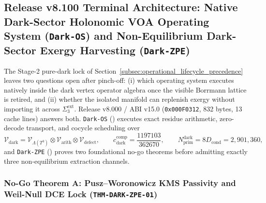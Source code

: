 \documentclass[11pt,onecolumn]{article}
\begin{document}
\FloatBarrier
\subsection{Release v8.100 Terminal Architecture: Native Dark-Sector Holonomic VOA Operating System (\texttt{Dark-OS}) and Non-Equilibrium Dark-Sector Exergy Harvesting (\texttt{Dark-ZPE})}
\label{subsec:release_v8_dark_os_zpe}

The Stage-2 pure-dark lock of Section~\ref{subsec:operational_lifecycle_precedence} leaves two questions open after pinch-off: (i) which operating system executes natively inside the dark vertex operator algebra once the visible Borrmann lattice is retired, and (ii) whether the isolated manifold can replenish exergy without importing it across $\Sigma_3^{\text{ext}}$. Release v8.000 / ABI v15.0 (\texttt{0x000F0312}, 832 bytes, 13 cache lines) answers both. \texttt{Dark-OS} () executes exact residue arithmetic, zero-decode transport, and cocycle scheduling over
\begin{equation}
\mathcal V_{\text{dark}}=\mathcal V_{\Lambda(T^3)}\otimes\mathcal V_{\text{arith}}\otimes\mathcal V_{\text{defect}},\qquad c_{\text{dark}}^{\text{comp}}=\frac{1197103}{362670},\qquad N_{\text{prim}}^{\text{dark}}=8D_{\text{cond}}=2{,}901{,}360,
\label{eq:v8_dark_voa}
\end{equation}
and \texttt{Dark-ZPE} () proves two foundational no-go theorems before admitting exactly three non-equilibrium extraction channels.

\subsubsection{No-Go Theorem A: Pusz--Woronowicz KMS Passivity and Weil-Null DCE Lock (\texttt{THM-DARK-ZPE-01})}
\label{subsubsec:thm_dark_zpe_01}
\end{document}
